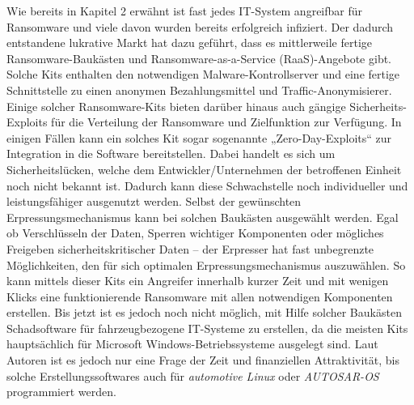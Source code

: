 Wie bereits in Kapitel 2 erwähnt ist fast jedes IT-System angreifbar 
für Ransomware und viele davon wurden bereits erfolgreich infiziert. 
Der dadurch entstandene lukrative Markt hat dazu geführt, dass es mittlerweile 
fertige Ransomware-Baukästen und Ransomware-as-a-Service (RaaS)-Angebote gibt. 
Solche Kits enthalten den notwendigen Malware-Kontrollserver und eine fertige 
Schnittstelle zu einen anonymen Bezahlungsmittel und Traffic-Anonymisierer. 
\newline
Einige solcher Ransomware-Kits bieten darüber hinaus auch gängige Sicherheits-Exploits 
für die Verteilung der Ransomware und Zielfunktion zur Verfügung. In einigen Fällen 
kann ein solches Kit sogar sogenannte „Zero-Day-Exploits“ zur Integration in die 
Software bereitstellen. Dabei handelt es sich um Sicherheitslücken, welche dem 
Entwickler/Unternehmen der betroffenen Einheit noch nicht bekannt ist. Dadurch 
kann diese Schwachstelle noch individueller und leistungsfähiger ausgenutzt werden.
\newline
Selbst der gewünschten Erpressungsmechanismus kann bei solchen Baukästen ausgewählt 
werden. Egal ob Verschlüsseln der Daten, Sperren wichtiger Komponenten oder mögliches 
Freigeben sicherheitskritischer Daten – der Erpresser hat fast unbegrenzte Möglichkeiten, 
den für sich optimalen Erpressungsmechanismus auszuwählen.
\newline
So kann mittels dieser Kits ein Angreifer innerhalb kurzer Zeit und mit wenigen Klicks 
eine funktionierende Ransomware mit allen notwendigen Komponenten erstellen.
\newline
Bis jetzt ist es jedoch noch nicht möglich, mit Hilfe solcher Baukästen Schadsoftware 
für fahrzeugbezogene IT-Systeme zu erstellen, da die meisten Kits hauptsächlich für 
Microsoft Windows-Betriebssysteme ausgelegt sind. Laut Autoren ist es jedoch nur eine 
Frage der Zeit und finanziellen Attraktivität, bis solche Erstellungssoftwares auch für 
\textit{automotive Linux} oder \textit{AUTOSAR-OS} programmiert werden. 
